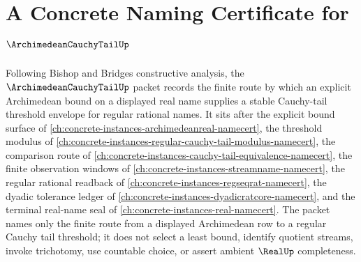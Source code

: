 \chapter{A Concrete Naming Certificate for $\ArchimedeanCauchyTailUp$}
\label{ch:concrete-instances-archimedean-cauchy-tail-namecert}

Following Bishop and Bridges constructive analysis, the $\ArchimedeanCauchyTailUp$ packet records the finite route by which an explicit Archimedean bound on a displayed real name supplies a stable Cauchy-tail threshold envelope for regular rational names. It sits after the explicit bound surface of \autoref{ch:concrete-instances-archimedeanreal-namecert}, the threshold modulus of \autoref{ch:concrete-instances-regular-cauchy-tail-modulus-namecert}, the comparison route of \autoref{ch:concrete-instances-cauchy-tail-equivalence-namecert}, the finite observation windows of \autoref{ch:concrete-instances-streamname-namecert}, the regular rational readback of \autoref{ch:concrete-instances-regseqrat-namecert}, the dyadic tolerance ledger of \autoref{ch:concrete-instances-dyadicratcore-namecert}, and the terminal real-name seal of \autoref{ch:concrete-instances-real-namecert}. The packet names only the finite route from a displayed Archimedean row to a regular Cauchy tail threshold; it does not select a least bound, identify quotient streams, invoke trichotomy, use countable choice, or assert ambient $\RealUp$ completeness.

